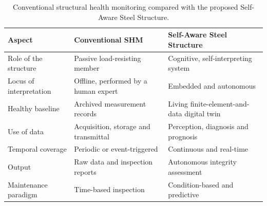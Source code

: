 \begin{table}[htbp]
\centering
\caption{Conventional structural health monitoring compared with the proposed Self-Aware Steel Structure.}
\label{tab:conv-vs-aware}
\begin{tabularx}{\linewidth}{@{}l X X@{}}
\toprule
\textbf{Aspect} & \textbf{Conventional SHM} & \textbf{Self-Aware Steel Structure} \\
\midrule
Role of the structure   & Passive load-resisting member            & Cognitive, self-interpreting system \\
Locus of interpretation & Offline, performed by a human expert     & Embedded and autonomous \\
Healthy baseline        & Archived measurement records             & Living finite-element-and-data digital twin \\
Use of data             & Acquisition, storage and transmittal     & Perception, diagnosis and prognosis \\
Temporal coverage       & Periodic or event-triggered              & Continuous and real-time \\
Output                  & Raw data and inspection reports          & Autonomous integrity assessment \\
Maintenance paradigm    & Time-based inspection                    & Condition-based and predictive \\
\bottomrule
\end{tabularx}
\end{table}
